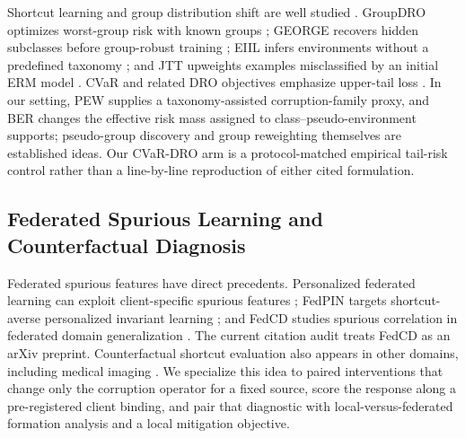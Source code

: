 Shortcut learning and group distribution shift are well studied \citep{geirhos2020shortcut}. GroupDRO optimizes worst-group risk with known groups \citep{sagawa2020groupdro}; GEORGE recovers hidden subclasses before group-robust training \citep{sohoni2020george}; EIIL infers environments without a predefined taxonomy \citep{creager2021eiil}; and JTT upweights examples misclassified by an initial ERM model \citep{liu2021jtt}. CVaR and related DRO objectives emphasize upper-tail loss \citep{rockafellar2000cvar,duchi2021uniform}. In our setting, PEW supplies a taxonomy-assisted corruption-family proxy, and BER changes the effective risk mass assigned to class--pseudo-environment supports; pseudo-group discovery and group reweighting themselves are established ideas. Our CVaR-DRO arm is a protocol-matched empirical tail-risk control rather than a line-by-line reproduction of either cited formulation.

\subsection{Federated Spurious Learning and Counterfactual Diagnosis}

Federated spurious features have direct precedents. Personalized federated learning can exploit client-specific spurious features \citep{wang2024pflspurious}; FedPIN targets shortcut-averse personalized invariant learning \citep{tang2024fedpin}; and FedCD studies spurious correlation in federated domain generalization \citep{ma2024fedcd}. The current citation audit treats FedCD as an arXiv preprint. Counterfactual shortcut evaluation also appears in other domains, including medical imaging \citep{vigneshwaran2026counterfactual,jabbour2020chestxray}. We specialize this idea to paired interventions that change only the corruption operator for a fixed source, score the response along a pre-registered client binding, and pair that diagnostic with local-versus-federated formation analysis and a local mitigation objective.
